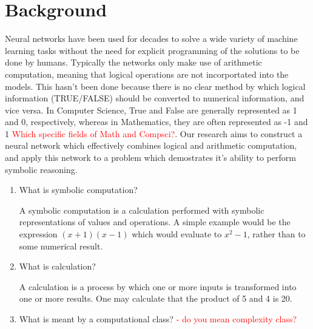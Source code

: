 \documentclass{article}
\author{Darius Barbano}
\title{\thetitle}
\date{}
\begin{document}
\maketitle
\newpage
\tableofcontents
\newpage

\begin{abstract}
    General artificial intelligence refers to machine intelligence than performs a task as successfully as a human does. A fundamental difference between human neural network and current machine neural networks is that only human networks combine symbolic reasoning with computation.
\end{abstract}
\newpage


\section{Background}

	Neural networks have been used for decades to solve a wide variety of machine learning tasks without the need for explicit programming of the solutions to be done by humans. Typically the networks only make use of arithmetic computation, meaning that logical operations are not incorportated into the models. This hasn't been done because there is no clear method by which logical information (TRUE/FALSE) should be converted to numerical information, and vice versa. In Computer Science, True and False are generally represented as 1 and 0, respectively, whereas in Mathematics, they are often represented as -1 and 1 \textcolor{red}{Which specific fields of Math and Compsci?}. Our research aims to construct a neural network which effectively combines logical and arithmetic computation, and apply this network to a problem which demostrates it's ability to perform symbolic reasoning.
	
    \begin{enumerate}
        \item What is symbolic computation?
        
        A symbolic computation is a calculation performed with symbolic representations of values and operations. A simple example would be the expression $(x + 1)(x - 1)$ which would evaluate to $x^2 - 1$, rather than to some numerical result.

        \item What is calculation?
        
        A calculation is a process by which one or more inputs is transformed into one or more results. One may calculate that the product of 5 and 4 is 20.
        
        \item What is meant by a computational class? \textcolor{red}{- do you mean complexity class?}
        
        
    \end{enumerate}
    
\end{document}
